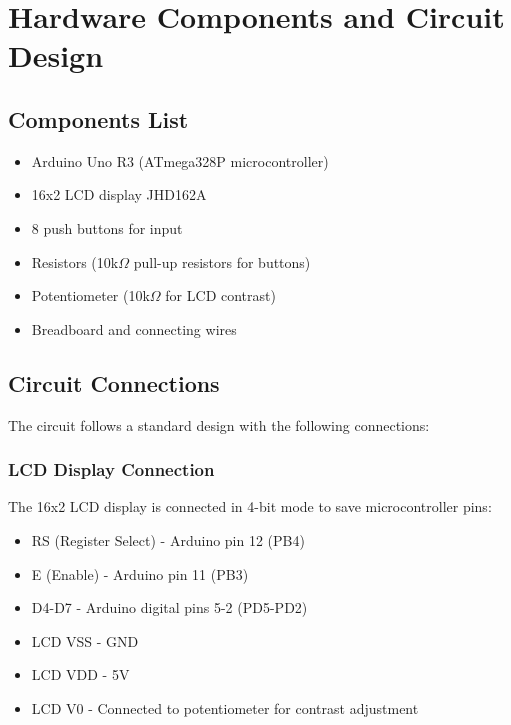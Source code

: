 \documentclass[12pt,a4paper]{article}
\begin{document}
\section{Hardware Components and Circuit Design}

\subsection{Components List}

\begin{itemize}
    \item Arduino Uno R3 (ATmega328P microcontroller)
    \item 16x2 LCD display JHD162A
    \item 8 push buttons for input
    \item Resistors (10k$\Omega$ pull-up resistors for buttons)
    \item Potentiometer (10k$\Omega$ for LCD contrast)
    \item Breadboard and connecting wires
\end{itemize}

\subsection{Circuit Connections}

The circuit follows a standard design with the following connections:

\subsubsection{LCD Display Connection}
The 16x2 LCD display is connected in 4-bit mode to save microcontroller pins:
\begin{itemize}
    \item RS (Register Select) - Arduino pin 12 (PB4)
    \item E (Enable) - Arduino pin 11 (PB3)
    \item D4-D7 - Arduino digital pins 5-2 (PD5-PD2)
    \item LCD VSS - GND
    \item LCD VDD - 5V
    \item LCD V0 - Connected to potentiometer for contrast adjustment
\end{itemize}
\end{document}
